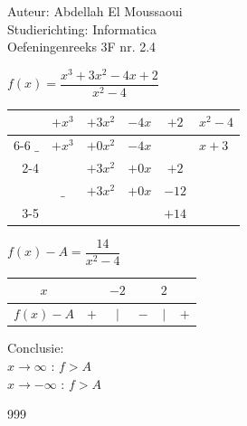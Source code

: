\documentclass[a4paper]{article}
\begin{document}
  
\noindent \large Auteur: Abdellah El Moussaoui \\
\noindent \large Studierichting: Informatica\\
\noindent \large Oefeningenreeks 3F nr. 2.4\\

\medskip

\normalsize

$ f(x) = \dfrac{x^3+3x^2-4x+2}{x^2-4} $ \\

\bigskip

\begin{tabular}{rcccc|l}
     & $+x^3$  & $+3x^2$  & $-4x$  & $+2$  & $x^2-4$  \\ \cline{6-6} 
$\_$ & $+x^3$  & $+0x^2$  & $-4x$  &       & $x+3$ \\ \cline{2-4}
     &         & $+3x^2$   & $+0x$  &  $+2$     &        \\
     & $\_$     & $+3x^2$  & $+0x$  & $-12$ &        \\ \cline{3-5}
     &          &       &          &  $+14$ &       \\ 
\end{tabular}

\bigskip

$ f(x) - A = \dfrac{14}{x^2 -4}$ \\

\bigskip

\begin{tabular}{c|ccccc}
$x$		   &     & $-2$ &           & $2$  \\ \hline
$f(x) - A$ & $+$ & $|$  & $-$ & $|$ & $+$  \\
\end{tabular}

\bigskip

Conclusie: \\

$ x \rightarrow \infty $ : $ f > A $ \\ 

$ x \rightarrow -\infty $ : $ f > A $ \\ 

\begin{thebibliography}{999}
\end{thebibliography}
\end{document}
